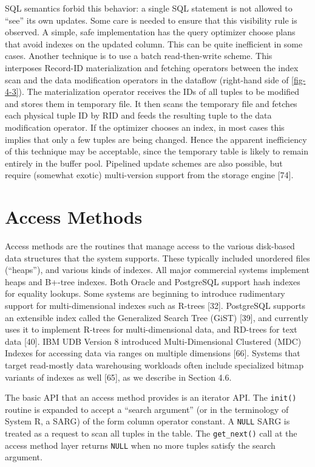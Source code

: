 \documentclass[b5paper,11pt,twoside,openright]{book}
\begin{document}
SQL semantics forbid this behavior: a single SQL statement is not
allowed to ``see'' its own updates. Some care is needed to ensure that
this visibility rule is observed. A simple, safe implementation has the
query optimizer choose plans that avoid indexes on the updated column.
This can be quite inefficient in some cases. Another technique is to use
a batch read-then-write scheme. This interposes Record-ID
materialization and fetching operators between the index scan and the
data modification operators in the dataflow (right-hand side of \autoref{fig-4-3}). The materialization operator receives the IDs of all tuples to be
modified and stores them in temporary file. It then scans the temporary
file and fetches each physical tuple ID by RID and feeds the resulting
tuple to the data modification operator. If the optimizer chooses an
index, in most cases this implies that only a few tuples are being
changed. Hence the apparent inefficiency of this technique may be
acceptable, since the temporary table is likely to remain entirely in
the buffer pool. Pipelined update schemes are also possible, but require
(somewhat exotic) multi-version support from the storage engine
{[}74{]}.

\hypertarget{access-methods}{%
\section{Access Methods}\label{access-methods}}

Access methods are the routines that manage access to the various
disk-based data structures that the system supports. These typically
included unordered files (``heaps''), and various kinds of indexes. All
major commercial systems implement heaps and B+-tree indexes. Both
Oracle and PostgreSQL support hash indexes for equality lookups. Some
systems are beginning to introduce rudimentary support for
multi-dimensional indexes such as R-trees {[}32{]}. PostgreSQL supports
an extensible index called the Generalized Search Tree (GiST) {[}39{]},
and currently uses it to implement R-trees for multi-dimensional data,
and RD-trees for text data {[}40{]}. IBM UDB Version 8 introduced
Multi-Dimensional Clustered (MDC) Indexes for accessing data via ranges
on multiple dimensions {[}66{]}. Systems that target read-mostly data
warehousing workloads often include specialized bitmap variants of
indexes as well {[}65{]}, as we describe in Section 4.6.

The basic API that an access method provides is an iterator API. The
\texttt{init()} routine is expanded to accept a ``search argument'' (or in the
terminology of System R, a SARG) of the form column operator constant. A
\texttt{NULL} SARG is treated as a request to scan all tuples in the table. The
\texttt{get\_next()} call at the access method layer returns \texttt{NULL} when no more
tuples satisfy the search argument.
\end{document}
